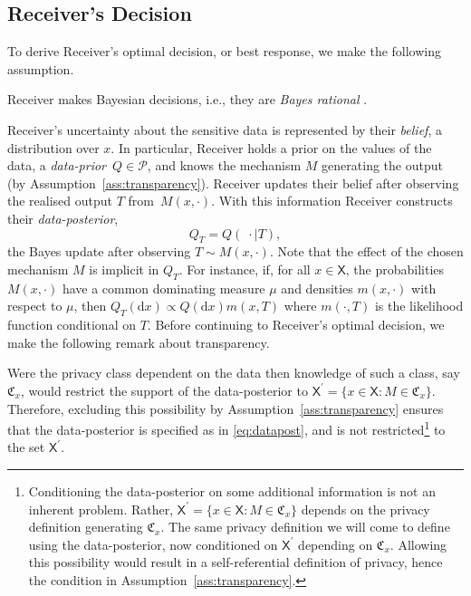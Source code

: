 \documentclass{article}
\theoremstyle{plain}
\theoremstyle{plain}
\theoremstyle{definition}
\theoremstyle{remark}
\theoremstyle{plain}
\newcommand{\xtrue}{x}
\newcommand{\cdotmid}{\;\cdot \mid}
\newcommand{\rmd}{\mathrm{d}}
\newcommand{\stat}{T}
\newcommand{\xset}{\mathsf{X}}
\begin{document}
\subsection{Receiver's Decision}\label{sec:receiver}
To derive Receiver's optimal decision, or best response, we make the following assumption.
\begin{assumption}\label{ass:bayes}
Receiver makes Bayesian decisions, i.e., they are \emph{Bayes rational} \citep{aumannCorrelatedEquilibriumExpression1987}.
\end{assumption}
Receiver's uncertainty about the sensitive data is represented by their \emph{belief}, a distribution over $x$. In particular,
Receiver holds a prior on the values of the data, a \textit{data-prior}~$Q\in\mathcal{P}$, and knows the mechanism $M$ generating the output (by Assumption~\ref{ass:transparency}). Receiver updates their belief after observing the realised output $T$ from~$M(x,\cdot)$. With this information Receiver constructs their \textit{data-posterior},
\begin{equation}\label{eq:datapost}
    Q_{\stat} = Q(\cdotmid \stat),
\end{equation}
the Bayes update after observing $\stat \sim M(\xtrue,\cdot)$.  Note that the effect of the chosen mechanism $M$ is implicit in $Q_T$. For instance, if, for all $x \in \xset$, the probabilities $M(x,\cdot)$ have a common dominating measure $\mu$ and densities $m(x,\cdot)$ with respect to $\mu$, then $ Q_{\stat}(\rmd x)  \propto Q(\rmd x)m(x,\stat)$ where $m(\cdot,T)$ is the likelihood function conditional on $T$.
 Before continuing to Receiver's optimal decision, we make the following remark about transparency. 

\begin{remark}
Were the privacy class dependent on the data then knowledge of such a class, say $\mathfrak{C}_x$, would restrict the support of the data-posterior to $\xset^\prime = \{x \in \xset: M\in \mathfrak{C}_x\}$. Therefore, excluding this possibility by Assumption~\ref{ass:transparency} ensures that the data-posterior is specified as in \eqref{eq:datapost}, and is not restricted\footnote{Conditioning the data-posterior on some additional information is not an inherent problem. Rather, $\xset^\prime = \{x \in \xset: M\in \mathfrak{C}_x\}$ depends on the privacy definition generating $\mathfrak{C}_x$. The same privacy definition we will come to define using the data-posterior, now conditioned on $\xset^\prime$ depending on $\mathfrak{C}_x$. Allowing this possibility would result in a self-referential definition of privacy, hence the condition in Assumption~\ref{ass:transparency}.} to the set $\xset^\prime$.
\end{remark}
\end{document}
